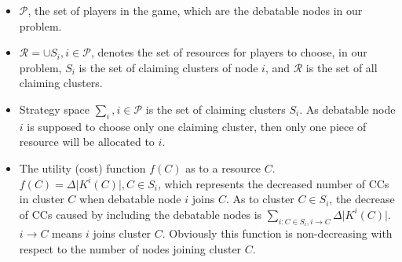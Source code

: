 \documentclass[10pt,journal,compsoc]{IEEEtran}
\theoremstyle{mytheoremstyle}
\theoremstyle{mytheoremstyle}
\theoremstyle{mytheoremstyle}
\begin{document}

\begin{itemize}
	\item $\mathcal{P}$, the set of players in the game, which are the debatable nodes in our problem.
	\item $\mathcal{R} = \cup S_i, i\in \mathcal{P}$, denotes the set of resources for players to choose, in our problem, $S_i$ is the set of claiming clusters of node $i$, and $\mathcal{R}$ is the set of all claiming clusters.
	\item Strategy space $\sum_i, i \in \mathcal{P}$ is the set of claiming clusters $S_i$.
	As debatable node $i$ is supposed to choose only one claiming cluster, then only one piece of resource will be allocated to $i$.%
	
	
	\item %
	The utility (cost) function $f(C)$ as to a resource $C$. 
	$f(C) = \Delta\vert K^i(C)|, C\in S_i$, which represents the decreased number of CCs in cluster $C$ when debatable node $i$ joins $C$.
	As to cluster $C\in S_i$, the decrease of CCs caused by including the debatable nodes is $\sum_{i:C\in S_i, i\rightarrow C} \Delta\vert K^i(C) \vert$. 
$i\rightarrow C$ means $i$ joins cluster $C$.
Obviously this function is non-decreasing with respect to the number of nodes joining cluster $C$.
	

\end{itemize}
\end{document}
